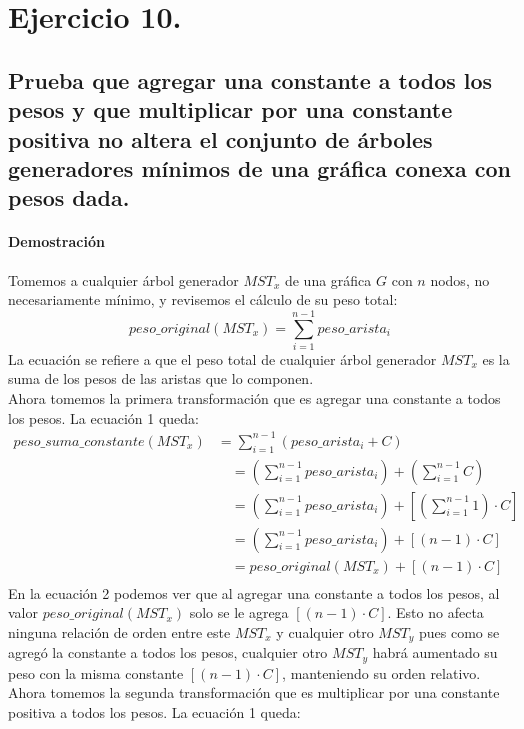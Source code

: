 \documentclass[12pt]{article}
\begin{document}
\section{Ejercicio 10.}
\subsection{Prueba que agregar una constante a todos los pesos y que multiplicar por una constante positiva no altera el conjunto de árboles generadores mínimos de una gráfica conexa con pesos dada.}
\paragraph{Demostración} Tomemos a cualquier árbol generador $MST_x$ de una gráfica $G$ con $n$ nodos, no necesariamente mínimo, y revisemos el cálculo de su peso total:
\begin{equation}
peso\_original(MST_x) = \sum_{i=1}^{n - 1} peso\_arista_i 
\end{equation}
La ecuación se refiere a que el peso total de cualquier árbol generador $MST_x$  es la suma de los pesos de las aristas que lo componen.\\
Ahora tomemos la primera transformación que es agregar una constante a todos los pesos. La ecuación 1 queda:
\begin{equation}
\begin{split}
peso\_suma\_constante(MST_x) & = \sum_{i=1}^{n - 1} (peso\_arista_i + C ) \\
&\quad = (\sum_{i=1}^{n - 1} peso\_arista_i) + (\sum_{i=1}^{n - 1} C) \\  
&\quad = (\sum_{i=1}^{n - 1} peso\_arista_i) + [(\sum_{i=1}^{n - 1}1) \cdot C] \\  
&\quad = (\sum_{i=1}^{n - 1} peso\_arista_i) + [(n-1) \cdot C] \\  
&\quad = peso\_original(MST_x)+ [(n-1) \cdot C] \\  
\end{split}
\end{equation}
En la ecuación 2 podemos ver que al agregar una constante a todos los pesos,  al valor $peso\_original(MST_x)$ solo se le agrega $[(n-1) \cdot C]$. Esto no afecta ninguna relación de orden entre este $MST_x$ y cualquier otro $MST_y$ pues como se agregó la constante a todos los pesos, cualquier otro $MST_y$ habrá aumentado su peso con la misma constante $[(n-1) \cdot C]$, manteniendo su orden relativo.\\
Ahora tomemos la segunda transformación que es multiplicar por una constante positiva a todos los pesos. La ecuación 1 queda:
\end{document}
